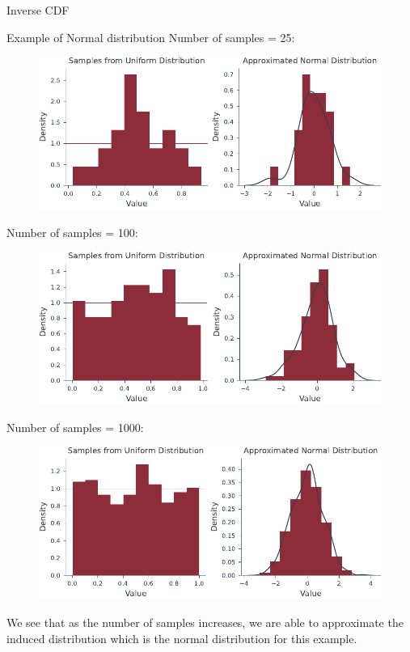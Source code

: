 \documentclass{beamer}
\begin{document}
\begin{section}{Inverse CDF}
    \begin{frame}{Example of Normal distribution}
        Number of samples = 25:
        \begin{figure}
                \centering
                \includegraphics[scale=0.8]{../figures/inverse_cdf_normal1.pdf}
        \end{figure}
    \end{frame}
    \begin{frame}
        Number of samples = 100:
        \begin{figure}
                \centering
                \includegraphics[scale=0.8]{../figures/inverse_cdf_normal2.pdf}
        \end{figure}
    \end{frame}
    \begin{frame}
        Number of samples = 1000:
        \begin{figure}
                \centering
                \includegraphics[scale=0.8]{../figures/inverse_cdf_normal3.pdf}
        \end{figure}
        We see that as the number of samples increases, we are able to approximate the induced distribution which is the normal distribution for this example.
    \end{frame}


\end{section}
\end{document}
